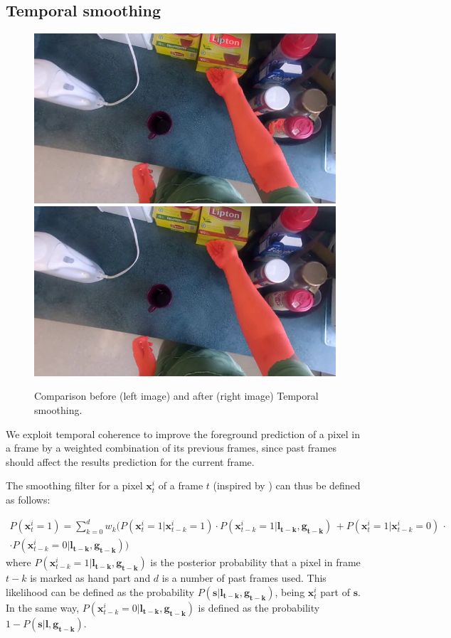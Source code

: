 \subsection{Temporal smoothing}
\begin{figure}[tb]
\centering
\includegraphics[width=.45\columnwidth]{./Figures/context-free2.jpg}
\includegraphics[width=.45\columnwidth]{./Figures/context-dependent2.jpg}
\caption{Comparison before (left image) and after (right image) Temporal smoothing.}
\label{fig:gesture_samples_time}
\end{figure}
We exploit temporal coherence to improve the foreground prediction of a pixel in a frame by a weighted combination of
its previous frames, since past frames should affect the results prediction for the current frame.

The smoothing filter for a pixel $\mathbf{x}_{t}^{i}$ of a frame $t$ (inspired by \cite{liu08}) can thus be defined as follows:

\begin{multline}
P(\mathbf{x}_{t}^{i}=1) = \sum_{k = 0}^{d} w_{k} \bigl( P(\mathbf{x}_{t}^{i}=1|\mathbf{x}_{t-k}^{i}=1) \cdot P(\mathbf{x}_{t-k}^{i}=1|\mathbf{l_{t-k}},\mathbf{g_{t-k}})\, + P(\mathbf{x}_{t}^{i}=1|\mathbf{x}_{t-k}^{i}=0) \, \cdot \\
\cdot P(\mathbf{x}_{t-k}^{i}=0|\mathbf{l_{t-k}},\mathbf{g_{t-k}}) \bigr)
\end{multline}
where $P(\mathbf{x}_{t-k}^{i}=1|\mathbf{l_{t-k}},\mathbf{g_{t-k}})$ is the posterior probability
that a pixel in frame $t-k$ is marked as hand part and $d$ is a number of past frames used. This likelihood can be defined as the probability $P(\mathbf{s}|\mathbf{l_{t-k}},\mathbf{g_{t-k}})$, being
$\mathbf{x}_{t}^{i}$ part of $\mathbf{s}$. In the same way, $P(\mathbf{x}_{t-k}^{i}=0|\mathbf{l_{t-k}},\mathbf{g_{t-k}})$ is defined as the probability
$1-P(\mathbf{s}|\mathbf{l},\mathbf{g_{t-k}})$. 

